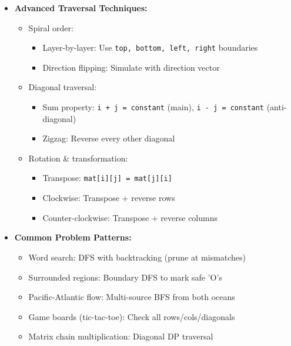 \documentclass[a4paper,10pt]{book}
\begin{document}
\begin{itemize}
    \item \textbf{Advanced Traversal Techniques:}
    \begin{itemize}
        \item Spiral order: 
        \begin{itemize}
            \item Layer-by-layer: Use \texttt{top, bottom, left, right} boundaries
            \item Direction flipping: Simulate with direction vector
        \end{itemize}
        \item Diagonal traversal: 
        \begin{itemize}
            \item Sum property: \texttt{i + j = constant} (main), \texttt{i - j = constant} (anti-diagonal)
            \item Zigzag: Reverse every other diagonal
        \end{itemize}
        \item Rotation \& transformation: 
        \begin{itemize}
            \item Transpose: \texttt{mat[i][j] = mat[j][i]}
            \item Clockwise: Transpose + reverse rows
            \item Counter-clockwise: Transpose + reverse columns
        \end{itemize}
    \end{itemize}
    
    \item \textbf{Common Problem Patterns:}
    \begin{itemize}
        \item Word search: DFS with backtracking (prune at mismatches)
        \item Surrounded regions: Boundary DFS to mark safe 'O's
        \item Pacific-Atlantic flow: Multi-source BFS from both oceans
        \item Game boards (tic-tac-toe): Check all rows/cols/diagonals
        \item Matrix chain multiplication: Diagonal DP traversal
    \end{itemize}
    

\end{itemize}
\end{document}
